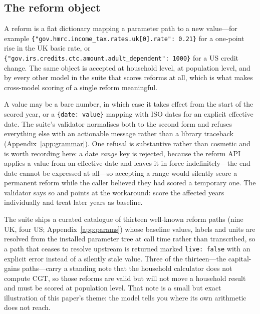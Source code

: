 \subsection{The reform object}
\label{sec:reform}

A reform is a flat dictionary mapping a parameter path to a new value---for example \texttt{\{"gov.hmrc.\allowbreak income\_tax.\allowbreak rates.\allowbreak uk[0].\allowbreak rate": 0.21\}} for a one-point rise in the UK basic rate, or \texttt{\{"gov.irs.\allowbreak credits.\allowbreak ctc.\allowbreak amount.\allowbreak adult\_dependent": 1000\}} for a US credit change. The same object is accepted at household level, at population level, and by every other model in the suite that scores reforms at all, which is what makes cross-model scoring of a single reform meaningful.

A value may be a bare number, in which case it takes effect from the start of the scored year, or a \texttt{\{date: value\}} mapping with ISO dates for an explicit effective date. The suite's validator normalises both to the second form and refuses everything else with an actionable message rather than a library traceback (Appendix~\ref{app:grammar}). One refusal is substantive rather than cosmetic and is worth recording here: a date \emph{range} key is rejected, because the reform API applies a value from an effective date and leaves it in force indefinitely---the end date cannot be expressed at all---so accepting a range would silently score a permanent reform while the caller believed they had scored a temporary one. The validator says so and points at the workaround: score the affected years individually and treat later years as baseline.

The suite ships a curated catalogue of thirteen well-known reform paths (nine UK, four US; Appendix~\ref{app:params}) whose baseline values, labels and units are resolved from the installed parameter tree at call time rather than transcribed, so a path that ceases to resolve upstream is returned marked \texttt{live: false} with an explicit error instead of a silently stale value. Three of the thirteen---the capital-gains paths---carry a standing note that the household calculator does not compute CGT, so those reforms are valid but will not move a household result and must be scored at population level. That note is a small but exact illustration of this paper's theme: the model tells you where its own arithmetic does not reach.
